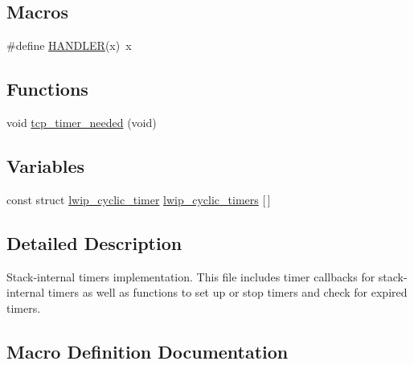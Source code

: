 \subsection*{Macros}
\begin{DoxyCompactItemize}
\item 
\#define \hyperlink{openmote-cc2538_2lwip_2src_2core_2timeouts_8c_a9f8226a5ad45684da350fe29edb1ba7b}{H\+A\+N\+D\+L\+ER}(x)~x
\end{DoxyCompactItemize}
\subsection*{Functions}
\begin{DoxyCompactItemize}
\item 
void \hyperlink{openmote-cc2538_2lwip_2src_2core_2timeouts_8c_a8181bc316fdf61b85f787c5cadfcd249}{tcp\+\_\+timer\+\_\+needed} (void)
\end{DoxyCompactItemize}
\subsection*{Variables}
\begin{DoxyCompactItemize}
\item 
const struct \hyperlink{structlwip__cyclic__timer}{lwip\+\_\+cyclic\+\_\+timer} \hyperlink{openmote-cc2538_2lwip_2src_2core_2timeouts_8c_addc06ab816f051a0fe6f280972eed142}{lwip\+\_\+cyclic\+\_\+timers} \mbox{[}$\,$\mbox{]}
\end{DoxyCompactItemize}


\subsection{Detailed Description}
Stack-\/internal timers implementation. This file includes timer callbacks for stack-\/internal timers as well as functions to set up or stop timers and check for expired timers. 

\subsection{Macro Definition Documentation}
\mbox{\label{openmote-cc2538_2lwip_2src_2core_2timeouts_8c_a9f8226a5ad45684da350fe29edb1ba7b}} 
